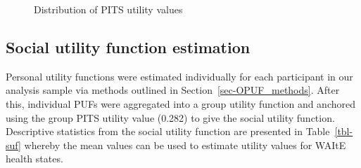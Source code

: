 \documentclass[
  letterpaper,
  DIV=11,
  numbers=noendperiod]{scrartcl}
\begin{document}
\begin{figure}


\caption{\label{fig-hist}Distribution of PITS utility values}

\end{figure}%

\subsection{Social utility function
estimation}\label{social-utility-function-estimation}

Personal utility functions were estimated individually for each
participant in our analysis sample via methods outlined in
Section~\ref{sec-OPUF_methods}. After this, individual PUFs were
aggregated into a group utility function and anchored using the group
PITS utility value (0.282) to give the social utility function.
Descriptive statistics from the social utility function are presented in
Table~\ref{tbl-suf} whereby the mean values can be used to estimate
utility values for WAItE health states.
\end{document}
